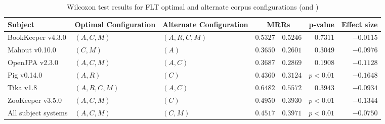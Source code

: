 \begin{landscape}

\begin{table}
\begin{spacing}{1.2}
\centering
\caption{Wilcoxon test results for FLT optimal and alternate corpus configurations (\cone and \ctwo)}
\label{table:combo-flt-corpus-sweep-wilcox}
\begin{tabular}{lllrrrr}
\toprule
                      Subject & Optimal Configuration & Alternate Configuration & \multicolumn{2}{c}{MRRs}  &  p-value & Effect size \\
\midrule
            BookKeeper v4.3.0 &           $(A, C, M)$ &          $(A, R, C, M)$ &    $0.5327$ &      $0.5246$ & $0.7311$ &   $-0.0115$ \\
               Mahout v0.10.0 &              $(C, M)$ &                   $(A)$ &    $0.3650$ &      $0.2601$ & $0.3049$ &   $-0.0976$ \\
               OpenJPA v2.3.0 &           $(A, C, M)$ &                $(A, C)$ &    $0.3687$ &      $0.2869$ & $0.1908$ &   $-0.1128$ \\
                  Pig v0.14.0 &              $(A, R)$ &                   $(C)$ &    $0.4360$ &      $0.3124$ & $p<0.01$ &   $-0.1648$ \\
                    Tika v1.8 &        $(A, R, C, M)$ &                $(A, C)$ &    $0.6482$ &      $0.5572$ & $0.3943$ &   $-0.0934$ \\
             ZooKeeper v3.5.0 &           $(A, C, M)$ &                   $(C)$ &    $0.4950$ &      $0.3930$ & $p<0.01$ &   $-0.1344$ \\
 \midrule
All subject systems &           $(A, C, M)$ &                $(C, M)$ &    $0.4517$ &      $0.3971$ & $p<0.01$ &   $-0.0750$ \\
\bottomrule
\end{tabular}

\end{spacing}
\end{table}



\end{landscape}
